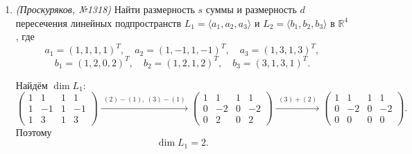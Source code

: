 \begin{enumerate}
Найдём размерность суммы:
\[
\begin{pmatrix}
    1 & 2 & 0 & 1 \\
    1 & 1 & 1 & 0 \\
    1 & 0 & 1 & 0 \\
    1 & 3 & 0 & 1
\end{pmatrix}
\xrightarrow{\,\, (2)-(1),\ (3)-(1),\ (4)- (1) \,\,}
\begin{pmatrix}
    1 & 2 & 0 & 1 \\
    0 & -1 & 1 & -1 \\
    0 & -2 & 1 & -1 \\
    0 & 1 & 0 & 0
\end{pmatrix}
\xrightarrow{\,\, (3)-2(2),\ (4)+(2) \,\,}
\]
\[
\xrightarrow{\,\, (3)-2(2),\ (4)+(2) \,\,}
\begin{pmatrix}
    1 & 2 & 0 & 1 \\
    0 & -1 & 1 & -1 \\
    0 & 0 & -1 & 1 \\
    0 & 0 & 1 & -1
\end{pmatrix}
\xrightarrow{\,\, (4)+(3) \,\,}
\begin{pmatrix}
    1 & 2 & 0 & 1 \\
    0 & -1 & 1 & -1 \\
    0 & 0 & -1 & 1 \\
    0 & 0 & 0 & 0
\end{pmatrix}.
\]

Значит,
\[
\dim(L_1+L_2)=3.
\]

По формуле Грассмана
\[
\dim(L_1\cap L_2)=\dim L_1+\dim L_2-\dim(L_1+L_2)=2+2-3=1.
\]

Итак,
\[
s=3,\qquad d=1.
\]

\item \textit{(Проскуряков, №1318)} Найти размерность $s$ суммы и размерность $d$ пересечения линейных подпространств $L_1 = \langle a_1, a_2, a_3 \rangle$ и $L_2 = \langle b_1, b_2, b_3 \rangle$ в $\mathbb{R}^4$, где
    \[
    a_1 = (1, 1, 1, 1)^T, \quad a_2 = (1, -1, 1, -1)^T, \quad a_3 = (1, 3, 1, 3)^T,
    \]
    \[
    b_1 = (1, 2, 0, 2)^T, \quad b_2 = (1, 2, 1, 2)^T, \quad b_3 = (3, 1, 3, 1)^T.
    \]

Найдём $\dim L_1$:
\[
    \begin{pmatrix}
        1 & 1 & 1 & 1 \\
        1 & -1 & 1 & -1 \\
        1 & 3 & 1 & 3
    \end{pmatrix}
    \xrightarrow{\,\, (2)-(1),\ (3)-(1) \,\,}
    \begin{pmatrix}
        1 & 1 & 1 & 1 \\
        0 & -2 & 0 & -2 \\
        0 & 2 & 0 & 2
    \end{pmatrix}
    \xrightarrow{\,\, (3)+(2) \,\,}
    \begin{pmatrix}
        1 & 1 & 1 & 1 \\
        0 & -2 & 0 & -2 \\
        0 & 0 & 0 & 0
    \end{pmatrix}.
\]
Поэтому
\[
\dim L_1 = 2.
\]


\end{enumerate}
